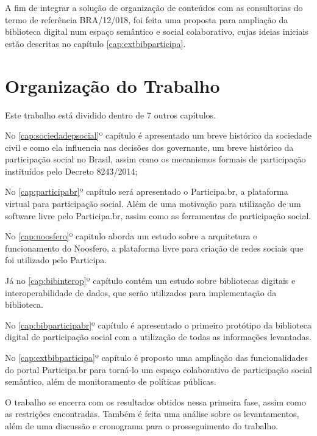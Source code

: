 A fim de integrar a solução de organização de conteúdos com as consultorias do termo de referência BRA/12/018, foi feita uma proposta para ampliação da biblioteca digital num espaço semântico e social colaborativo, cujas ideias iniciais estão descritas no capítulo \ref{cap:extbibparticipa}.

\section{Organização do Trabalho}

Este trabalho está dividido dentro de 7 outros capítulos. 

No \ref{cap:sociedadepsocial}º capítulo é apresentado um breve histórico da sociedade civil e como ela influencia nas decisões dos governante, um breve histórico da participação social no Brasil, assim como os mecanismos formais de participação instituídos pelo Decreto 8243/2014;

No \ref{cap:participabr}º capítulo será apresentado o Participa.br, a plataforma virtual para participação social. Além de uma motivação para utilização de um software livre pelo Participa.br, assim como as ferramentas de participação social.

No \ref{cap:noosfero}º capitulo aborda um estudo sobre a arquitetura e funcionamento do Noosfero, a plataforma livre para criação de redes sociais que foi utilizado pelo Participa.

Já no \ref{cap:bibinterop}º capítulo contém um estudo sobre bibliotecas digitais e interoperabilidade de dados, que serão utilizados para implementação da biblioteca.

No \ref{cap:bibparticipabr}º capítulo é apresentado o primeiro protótipo da biblioteca digital de participação social com a utilização de todas as informações levantadas.

No \ref{cap:extbibparticipa}º capítulo é proposto uma ampliação das funcionalidades do portal Participa.br para torná-lo um espaço colaborativo de participação social semântico, além de monitoramento de políticas públicas.

O trabalho se encerra com os resultados obtidos nessa primeira fase, assim como as restrições encontradas. Também é feita uma análise sobre os levantamentos, além de uma discussão e cronograma para o prosseguimento do trabalho.